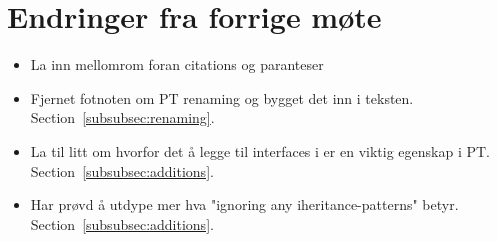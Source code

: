 
\chapter*{Endringer fra forrige møte}

\begin{itemize}
    \item La inn mellomrom foran citations og paranteser
    \item Fjernet fotnoten om PT renaming og bygget det inn i teksten.
    Section~\vref{subsubsec:renaming}.
    \item La til litt om hvorfor det å legge til interfaces i  er en viktig egenskap i PT.
    Section~\vref{subsubsec:additions}.
    \item Har prøvd å utdype mer hva "ignoring any iheritance-patterns" betyr.
    Section~\vref{subsubsec:additions}.
\end{itemize}

